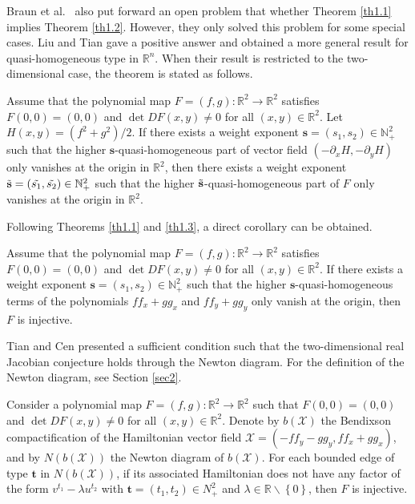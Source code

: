 \documentclass[reqno]{amsart}
\begin{document}
Braun et al.\ \cite{bib 7} also put forward an open problem that whether Theorem \ref{th1.1} implies Theorem \ref{th1.2}. However, they only solved this problem for some special cases. Liu and Tian \cite{bib 19} gave a positive answer and obtained a more general result for quasi-homogeneous type in $\mathbb{R}^n$. When their result is restricted to the two-dimensional case, the theorem is stated as follows.

\begin{theorem} \label{th1.3}
Assume that the polynomial map $F=(f,g):\mathbb{R}^2 \to \mathbb{R}^2$ satisfies 
$ F(0,0)=(0,0) $ and $ \det DF(x,y)\neq 0 $ for all $ (x,y)\in \mathbb{R}^2 $.
 Let $H(x,y)=(f^2+g^2)/2$. If there exists a weight exponent 
$\mathbf{s}=(s_1,s_2)\in \mathbb{N}_{+}^{2}$ such that the higher 
$\mathbf{s}$-quasi-homogeneous part of vector field $(-\partial_{x}H,-\partial_{y}H)$ 
only vanishes at the origin in $\mathbb{R}^2$, then there exists a weight exponent 
$\Tilde{\mathbf{s}}=(\Tilde{s_1},\Tilde{s_2})\in \mathbb{N}_{+}^{2}$ such that the higher 
$\Tilde{\mathbf{s}}$-quasi-homogeneous part of $F$ only vanishes at the origin in 
$\mathbb{R}^2$.
\end{theorem}

Following Theorems \ref{th1.1} and \ref{th1.3}, a direct corollary can be obtained.

\begin{corollary}\label{th1.5}
Assume that the polynomial map $F=(f,g):\mathbb{R}^2 \to \mathbb{R}^2$ satisfies 
$ F(0,0)=(0,0) $ and $ \det DF(x,y)\neq 0 $ for all $ (x, y)\in \mathbb{R}^2 $. 
If there exists a weight exponent $\mathbf{s}=(s_1,s_2)\in \mathbb{N}_{+}^{2}$ such 
that the higher $\mathbf{s}$-quasi-homogeneous terms of the polynomials $ ff_{x}+gg_{x} $ 
and $ ff_{y}+gg_{y} $ only vanish at the origin, then $F$ is injective.
\end{corollary}

Tian and Cen \cite{bib 25} presented a  sufficient condition such that the 
two-dimensional real Jacobian conjecture holds through the Newton diagram. 
For the definition of the Newton diagram, see Section \ref{sec2}.

\begin{theorem} \label{th1.6}
Consider a polynomial map $ F=(f, g):\mathbb{R}^2 \to \mathbb{R}^2 $ such that 
$ F(0,0)=(0,0) $ and $ \det DF(x,y)\neq 0 $ for all $ (x,y)\in \mathbb{R}^2 $. 
Denote by $ b(\mathcal{X}) $ the Bendixson compactification of the Hamiltonian vector 
field $ \mathcal{X}=(-ff_{y}-gg_{y}, ff_{x}+gg_{x})$, and by $ N(b(\mathcal{X})) $ 
the Newton diagram of $ b(\mathcal{X}) $. For each bounded edge of type 
$ \mathbf{t} $ in $ N(b(\mathcal{X})) $, if its associated Hamiltonian does not have 
any factor of the form $ v^{t_1}-\lambda u^{t_2} $ with 
$ \mathbf{t}=(t_{1},t_{2})\in N_{+}^{2} $ and 
$ \lambda \in \mathbb{R}\backslash \left\{0\right\} $, then $ F $ is injective.
\end{theorem}
\end{document}
